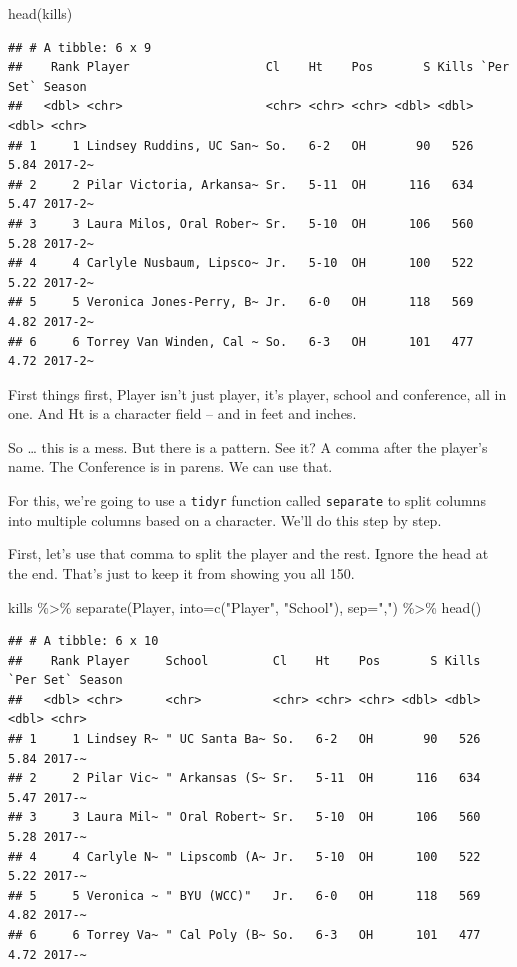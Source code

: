 \documentclass[
]{book}
\newenvironment{Shaded}{\begin{snugshade}}{\end{snugshade}}
\newcommand{\AttributeTok}[1]{\textcolor[rgb]{0.77,0.63,0.00}{#1}}
\newcommand{\FunctionTok}[1]{\textcolor[rgb]{0.00,0.00,0.00}{#1}}
\newcommand{\NormalTok}[1]{#1}
\newcommand{\SpecialCharTok}[1]{\textcolor[rgb]{0.00,0.00,0.00}{#1}}
\newcommand{\StringTok}[1]{\textcolor[rgb]{0.31,0.60,0.02}{#1}}
\begin{document}
\begin{Shaded}
\begin{Highlighting}[]
\FunctionTok{head}\NormalTok{(kills)}
\end{Highlighting}
\end{Shaded}

\begin{verbatim}
## # A tibble: 6 x 9
##    Rank Player                   Cl    Ht    Pos       S Kills `Per Set` Season 
##   <dbl> <chr>                    <chr> <chr> <chr> <dbl> <dbl>     <dbl> <chr>  
## 1     1 Lindsey Ruddins, UC San~ So.   6-2   OH       90   526      5.84 2017-2~
## 2     2 Pilar Victoria, Arkansa~ Sr.   5-11  OH      116   634      5.47 2017-2~
## 3     3 Laura Milos, Oral Rober~ Sr.   5-10  OH      106   560      5.28 2017-2~
## 4     4 Carlyle Nusbaum, Lipsco~ Jr.   5-10  OH      100   522      5.22 2017-2~
## 5     5 Veronica Jones-Perry, B~ Jr.   6-0   OH      118   569      4.82 2017-2~
## 6     6 Torrey Van Winden, Cal ~ So.   6-3   OH      101   477      4.72 2017-2~
\end{verbatim}

First things first, Player isn't just player, it's player, school and conference, all in one. And Ht is a character field -- and in feet and inches.

So \ldots{} this is a mess. But there is a pattern. See it? A comma after the player's name. The Conference is in parens. We can use that.

For this, we're going to use a \texttt{tidyr} function called \texttt{separate} to split columns into multiple columns based on a character. We'll do this step by step.

First, let's use that comma to split the player and the rest. Ignore the head at the end. That's just to keep it from showing you all 150.

\begin{Shaded}
\begin{Highlighting}[]
\NormalTok{kills }\SpecialCharTok{\%\textgreater{}\%} \FunctionTok{separate}\NormalTok{(Player, }\AttributeTok{into=}\FunctionTok{c}\NormalTok{(}\StringTok{"Player"}\NormalTok{, }\StringTok{"School"}\NormalTok{), }\AttributeTok{sep=}\StringTok{","}\NormalTok{) }\SpecialCharTok{\%\textgreater{}\%} \FunctionTok{head}\NormalTok{()}
\end{Highlighting}
\end{Shaded}

\begin{verbatim}
## # A tibble: 6 x 10
##    Rank Player     School         Cl    Ht    Pos       S Kills `Per Set` Season
##   <dbl> <chr>      <chr>          <chr> <chr> <chr> <dbl> <dbl>     <dbl> <chr> 
## 1     1 Lindsey R~ " UC Santa Ba~ So.   6-2   OH       90   526      5.84 2017-~
## 2     2 Pilar Vic~ " Arkansas (S~ Sr.   5-11  OH      116   634      5.47 2017-~
## 3     3 Laura Mil~ " Oral Robert~ Sr.   5-10  OH      106   560      5.28 2017-~
## 4     4 Carlyle N~ " Lipscomb (A~ Jr.   5-10  OH      100   522      5.22 2017-~
## 5     5 Veronica ~ " BYU (WCC)"   Jr.   6-0   OH      118   569      4.82 2017-~
## 6     6 Torrey Va~ " Cal Poly (B~ So.   6-3   OH      101   477      4.72 2017-~
\end{verbatim}
\end{document}
